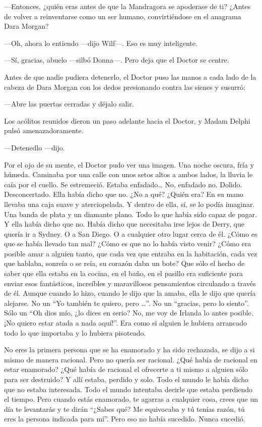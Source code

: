 ---Entonces, ¿quién eras antes de que la Mandragora se apoderase de ti?
¿Antes de volver a reinventarse como un ser humano, convirtiéndose en el
anagrama Dara Morgan?

---Oh, ahora lo entiendo ---dijo Wilf---. Eso es muy inteligente.

---Sí, gracias, abuelo ---silbó Donna---. Pero deja que el Doctor se
centre.

Antes de que nadie pudiera detenerlo, el Doctor puso las manos a cada
lado de la cabeza de Dara Morgan con los dedos presionando contra las
sienes y susurró:~

---Abre las puertas cerradas y déjalo salir.

Los acólitos reunidos dieron un paso adelante hacia el Doctor, y Madam
Delphi pulsó amenazadoramente.

---Detenedlo ---dijo.

Por el ojo de su mente, el Doctor pudo ver una imagen. Una noche oscura,
fría y húmeda. Caminaba por una calle con unos setos altos a ambos
lados, la lluvia le caía por el cuello. Se estremeció. Estaba
enfadado\ldots{} No, enfadado no. Dolido. Desconcertado. Ella había
dicho que no. ¿No a qué? ¿Quién era? En su mano llevaba una caja suave
y aterciopelada. Y dentro de ella, sí, se lo podía imaginar. Una banda
de plata y un diamante plano. Todo lo que había sido capaz de pagar. Y
ella había dicho que no. Había dicho que necesitaba irse lejos de Derry,
que quería ir a Sydney. O a San Diego. O a cualquier otro lugar cerca de
él. ¿Cómo es que se había llevado tan mal? ¿Cómo es que no lo había
visto venir? ¿Cómo era posible amar a alguien tanto, que cada vez que
entraba en la habitación, cada vez que hablaba, sonreía o se reía, su
corazón daba un bote? Que sólo el hecho de saber que ella estaba en la
cocina, en el baño, en el pasillo era suficiente para enviar esos
fantásticos, increíbles y maravillosos pensamientos circulando a través
de él. Aunque cuando lo hizo, cuando le dijo que la amaba, ella le dijo
que quería alejarse. No un ``Yo también te quiero, pero \ldots{}''. No
un ``gracias, pero lo siento''. Sólo un ``Oh dios mío, ¿lo dices en
serio? No, me voy de Irlanda lo antes posible. ¡No quiero estar atada a
nada aquí!''. Era como si alguien le hubiera arrancado todo lo que
importaba y lo hubiera pisoteado.

No eres la primera persona que se ha enamorado y ha sido rechazada, se
dijo a si mismo de manera racional. Pero no quería ser racional. ¿Qué
había de racional en estar enamorado? ¿Qué había de racional el
ofrecerte a ti mismo a alguien sólo para ser destruido? Y allí estaba,
perdido y solo. Todo el mundo le había dicho que no estaba interesada.
Todo el mundo intentaba decirle que estaba perdiendo el tiempo. Pero
cuando estás enamorado, te agarras a cualquier cosa, crees que un día te
levantarás y te dirán ``¿Sabes qué? Me equivocaba y tú tenías razón, tú
eres la persona indicada para mí''. Pero eso no había sucedido. Nunca
sucedió.

